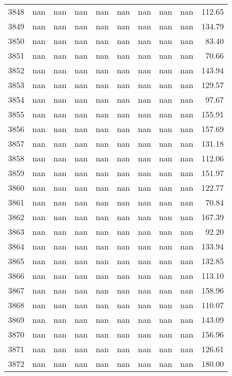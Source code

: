 \begin{tabular}{lrrrrrrrrr}
3848 & nan & nan & nan & nan & nan & nan & nan & nan & 112.65 \\
3849 & nan & nan & nan & nan & nan & nan & nan & nan & 134.79 \\
3850 & nan & nan & nan & nan & nan & nan & nan & nan & 83.40 \\
3851 & nan & nan & nan & nan & nan & nan & nan & nan & 70.66 \\
3852 & nan & nan & nan & nan & nan & nan & nan & nan & 143.94 \\
3853 & nan & nan & nan & nan & nan & nan & nan & nan & 129.57 \\
3854 & nan & nan & nan & nan & nan & nan & nan & nan & 97.67 \\
3855 & nan & nan & nan & nan & nan & nan & nan & nan & 155.91 \\
3856 & nan & nan & nan & nan & nan & nan & nan & nan & 157.69 \\
3857 & nan & nan & nan & nan & nan & nan & nan & nan & 131.18 \\
3858 & nan & nan & nan & nan & nan & nan & nan & nan & 112.06 \\
3859 & nan & nan & nan & nan & nan & nan & nan & nan & 151.97 \\
3860 & nan & nan & nan & nan & nan & nan & nan & nan & 122.77 \\
3861 & nan & nan & nan & nan & nan & nan & nan & nan & 70.84 \\
3862 & nan & nan & nan & nan & nan & nan & nan & nan & 167.39 \\
3863 & nan & nan & nan & nan & nan & nan & nan & nan & 92.20 \\
3864 & nan & nan & nan & nan & nan & nan & nan & nan & 133.94 \\
3865 & nan & nan & nan & nan & nan & nan & nan & nan & 132.85 \\
3866 & nan & nan & nan & nan & nan & nan & nan & nan & 113.10 \\
3867 & nan & nan & nan & nan & nan & nan & nan & nan & 158.96 \\
3868 & nan & nan & nan & nan & nan & nan & nan & nan & 110.07 \\
3869 & nan & nan & nan & nan & nan & nan & nan & nan & 143.09 \\
3870 & nan & nan & nan & nan & nan & nan & nan & nan & 156.96 \\
3871 & nan & nan & nan & nan & nan & nan & nan & nan & 126.61 \\
3872 & nan & nan & nan & nan & nan & nan & nan & nan & 180.00 \\

\end{tabular}
